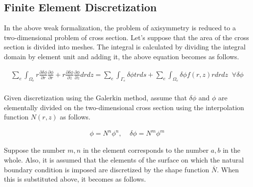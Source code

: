 \subsection{Finite Element Discretization}

In the above weak formalization, the problem of axisymmetry is reduced to a two-dimensional problem of cross section. Let's suppose that the area of ​​the cross section is divided into meshes. The integral is calculated by dividing the integral domain by element unit and adding it, the above equation becomes as follows.

\begin{eqnarray}
\sum_e\int_{\Omega_e} r\frac{\partial\delta\phi}{\partial r}\frac{\partial \phi}{\partial r} + r\frac{\partial\delta\phi}{\partial z}\frac{\partial\phi}{\partial z} drdz = \sum_e\int_{\Gamma_e} \delta\phi trds + \sum_e\int_{\Omega_e}\delta\phi f(r,z) rdrdz\;\;\forall \delta\phi\\
\end{eqnarray}


Given discretization using the Galerkin method, assume that $\delta\phi$ and $\phi$ are elementally divided on the two-dimensional cross section using the interpolation function $N(r,z)$ as follows.

\begin{eqnarray}
\phi = N^n\phi^n,\;\;\;\; \delta\phi = N^m\phi^m
\end{eqnarray}



Suppose the number $m,n$ in the element corresponds to the number $a,b$ in the whole. Also, it is assumed that the elements of the surface on which the natural boundary condition is imposed are discretized by the shape function $\bar{N}$. When this is substituted above, it becomes as follows.

